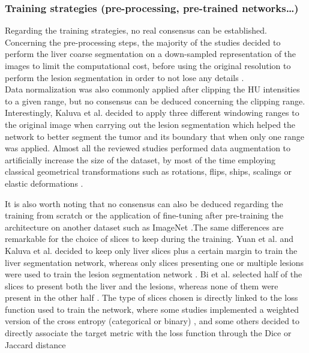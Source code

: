 \subsubsection{Training strategies (pre-processing, pre-trained networks\ldots{})}

Regarding the training strategies, no real consensus can be established.\\
Concerning the pre-processing steps, the majority of the studies decided
to perform the liver coarse segmentation on a down-sampled
representation of the images to limit the computational cost, before
using the original resolution to perform the lesion segmentation in
order to not lose any details \cite{Li2018, Han2017, Yuan2017, Kaluva2018, Vorontsov2018}.\\
Data normalization was also commonly applied after clipping the HU
intensities to a given range, but no consensus can be deduced concerning
the clipping range. Interestingly, Kaluva et al. decided to
apply three different windowing ranges to the original image when carrying
out the lesion segmentation which helped the network to better segment the tumor and its boundary that when only one range was applied.
Almost all the reviewed studies performed data augmentation to
artificially increase the size of the dataset, by most of the time
employing classical geometrical transformations such as rotations,
flips, ships, scalings or elastic deformations \cite{Frid-adar2017, Ben-Cohen, Rafiei2018, Christ2017, Li2018, Han2017, Yuan2017, Bellver2017, Bi2017, Vorontsov2018}.

It is also worth noting that no consensus can also be deduced regarding the
training from scratch or the application of fine-tuning after
pre-training the architecture on another dataset such as ImageNet \cite{Bi2017, Bellver2017, Christ2017} .The same differences are remarkable for the choice of slices to
keep during the training. Yuan et al. and Kaluva et al. decided to keep only liver slices plus a certain margin to train the
liver segmentation network, whereas only slices presenting one or
multiple lesions were used to train the lesion segmentation network \cite{Yuan2017, Kaluva2018}.
Bi et al. selected half of the slices to present both the liver
and the lesions, whereas none of them were present in the other half \cite{Bi2017}.
The type of slices chosen is directly linked to the loss function used
to train the network, where some studies implemented a weighted version
of the cross entropy (categorical or binary) \cite{Han2017, Bellver2017, Ben-Cohen, Christ2017}, and some others decided to directly associate the target metric
with the loss function through the Dice or Jaccard distance \cite{Yuan2017, Chlebus2018, Vorontsov2018}

